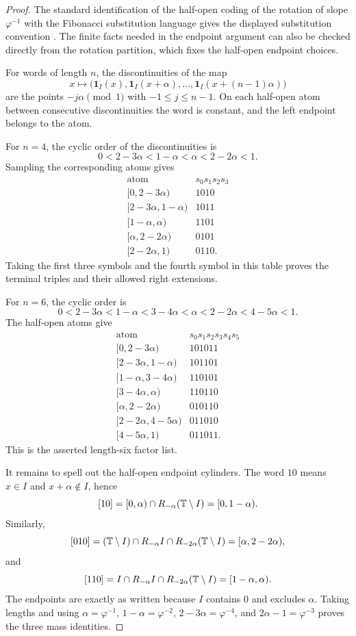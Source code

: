 \begin{proof}
The standard identification of the half-open coding of the rotation of slope
\(\varphi^{-1}\) with the Fibonacci substitution language gives the displayed
substitution convention \cite{QueffelecSubstitution,Fogg2002}.  The finite
facts needed in the endpoint argument can also be checked directly from the
rotation partition, which fixes the half-open endpoint choices.

For words of length \(n\), the discontinuities of the map
\[
x\longmapsto
\bigl(\mathbf 1_I(x),\mathbf 1_I(x+\alpha),\ldots,
\mathbf 1_I(x+(n-1)\alpha)\bigr)
\]
are the points \(-j\alpha\pmod1\) with \(-1\le j\le n-1\).  On each
half-open atom between consecutive discontinuities the word is constant, and
the left endpoint belongs to the atom.

For \(n=4\), the cyclic order of the discontinuities is
\[
0<2-3\alpha<1-\alpha<\alpha<2-2\alpha<1.
\]
Sampling the corresponding atoms gives
\[
\begin{array}{c|c}
\text{atom} & s_0s_1s_2s_3\\
\hline
{[0,2-3\alpha)} & 1010\\
{[2-3\alpha,1-\alpha)} & 1011\\
{[1-\alpha,\alpha)} & 1101\\
{[\alpha,2-2\alpha)} & 0101\\
{[2-2\alpha,1)} & 0110 .
\end{array}
\]
Taking the first three symbols and the fourth symbol in this table proves the
terminal triples and their allowed right extensions.

For \(n=6\), the cyclic order is
\[
0<2-3\alpha<1-\alpha<3-4\alpha<\alpha<2-2\alpha<4-5\alpha<1.
\]
The half-open atoms give
\[
\begin{array}{c|c}
\text{atom} & s_0s_1s_2s_3s_4s_5\\
\hline
{[0,2-3\alpha)} & 101011\\
{[2-3\alpha,1-\alpha)} & 101101\\
{[1-\alpha,3-4\alpha)} & 110101\\
{[3-4\alpha,\alpha)} & 110110\\
{[\alpha,2-2\alpha)} & 010110\\
{[2-2\alpha,4-5\alpha)} & 011010\\
{[4-5\alpha,1)} & 011011 .
\end{array}
\]
This is the asserted length-six factor list.

It remains to spell out the half-open endpoint cylinders.  The word \(10\)
means \(x\in I\) and \(x+\alpha\notin I\), hence
\[
[10]=[0,\alpha)\cap R_{-\alpha}(\mathbb{T}\setminus I)=[0,1-\alpha).
\]
Similarly,
\[
[010]
=
(\mathbb{T}\setminus I)\cap R_{-\alpha}I\cap R_{-2\alpha}(\mathbb{T}\setminus I)
=[\alpha,2-2\alpha),
\]
and
\[
[110]
=
I\cap R_{-\alpha}I\cap R_{-2\alpha}(\mathbb{T}\setminus I)
=[1-\alpha,\alpha).
\]
The endpoints are exactly as written because \(I\) contains \(0\) and excludes
\(\alpha\).  Taking lengths and using
\(\alpha=\varphi^{-1}\), \(1-\alpha=\varphi^{-2}\),
\(2-3\alpha=\varphi^{-4}\), and \(2\alpha-1=\varphi^{-3}\) proves the three
mass identities.
\end{proof}


